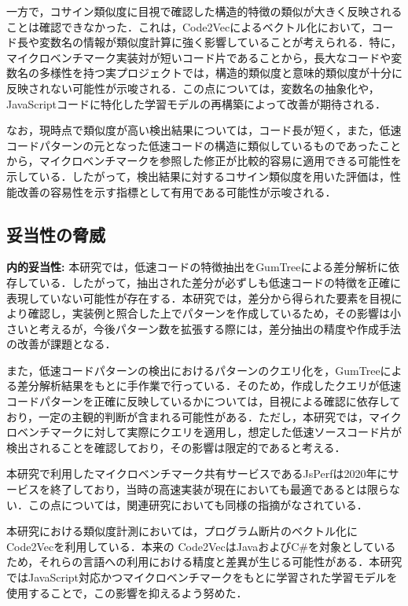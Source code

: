 \documentclass[submit,techrep,noauthor]{ipsj}
\begin{document}
一方で，コサイン類似度に目視で確認した構造的特徴の類似が大きく反映されることは確認できなかった．これは，Code2Vecによるベクトル化において，コード長や変数名の情報が類似度計算に強く影響していることが考えられる．特に，マイクロベンチマーク実装対が短いコード片であることから，長大なコードや変数名の多様性を持つ実プロジェクトでは，構造的類似度と意味的類似度が十分に反映されない可能性が示唆される．この点については，変数名の抽象化や，JavaScriptコードに特化した学習モデルの再構築によって改善が期待される．

なお，現時点で類似度が高い検出結果については，コード長が短く，また，低速コードパターンの元となった低速コードの構造に類似しているものであったことから，マイクロベンチマークを参照した修正が比較的容易に適用できる可能性を示している．したがって，検出結果に対するコサイン類似度を用いた評価は，性能改善の容易性を示す指標として有用である可能性が示唆される．


\subsection{妥当性の脅威}

\noindent\textbf{内的妥当性: }
本研究では，低速コードの特徴抽出をGumTreeによる差分解析に依存している．したがって，抽出された差分が必ずしも低速コードの特徴を正確に表現していない可能性が存在する．本研究では，差分から得られた要素を目視により確認し，実装例と照合した上でパターンを作成しているため，その影響は小さいと考えるが，今後パターン数を拡張する際には，差分抽出の精度や作成手法の改善が課題となる．

また，低速コードパターンの検出におけるパターンのクエリ化を，GumTreeによる差分解析結果をもとに手作業で行っている．そのため，作成したクエリが低速コードパターンを正確に反映しているかについては，目視による確認に依存しており，一定の主観的判断が含まれる可能性がある．ただし，本研究では，マイクロベンチマークに対して実際にクエリを適用し，想定した低速ソースコード片が検出されることを確認しており，その影響は限定的であると考える．

本研究で利用したマイクロベンチマーク共有サービスであるJsPerfは2020年にサービスを終了しており，当時の高速実装が現在においても最適であるとは限らない．この点については，関連研究\cite{omori}においても同様の指摘がなされている．

本研究における類似度計測においては，プログラム断片のベクトル化にCode2Vecを利用している．本来の Code2VecはJavaおよびC\#を対象としているため，それらの言語への利用における精度と差異が生じる可能性がある．本研究ではJavaScript対応かつマイクロベンチマークをもとに学習された学習モデル\cite{saiki}を使用することで，この影響を抑えるよう努めた．
\end{document}
